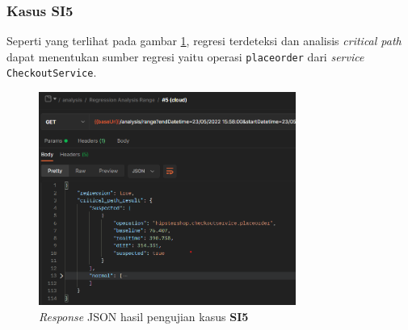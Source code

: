 \pagebreak

\subsubsection{Kasus SI5}
Seperti yang terlihat pada gambar \ref{result_json_5}, regresi terdeteksi dan analisis \textit{critical path} dapat menentukan sumber regresi yaitu operasi \texttt{placeorder} dari \textit{service} \texttt{CheckoutService}.
\begin{figure}[!htb]
	\centering
	\includegraphics[width=0.75\textwidth]{resources/ch4/json/5.png}
	\caption{\textit{Response} JSON hasil pengujian kasus \textbf{SI5}}
	\label{result_json_5}
\end{figure}

\pagebreak

